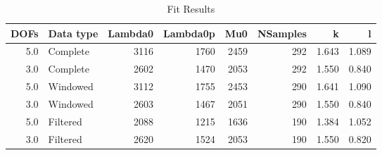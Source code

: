 \begin{table}
\centering
\caption{Fit Results}
\begin{tabular}{rlrrrrrr}
\toprule
 DOFs & Data type &  Lambda0 &  Lambda0p &   Mu0 &  NSamples &      k &      l \\
\midrule
  5.0 &  Complete &     3116 &      1760 &  2459 &       292 &  1.643 &  1.089 \\
  3.0 &  Complete &     2602 &      1470 &  2053 &       292 &  1.550 &  0.840 \\
  5.0 &  Windowed &     3112 &      1755 &  2453 &       290 &  1.641 &  1.090 \\
  3.0 &  Windowed &     2603 &      1467 &  2051 &       290 &  1.550 &  0.840 \\
  5.0 &  Filtered &     2088 &      1215 &  1636 &       190 &  1.384 &  1.052 \\
  3.0 &  Filtered &     2620 &      1524 &  2053 &       190 &  1.550 &  0.820 \\
\bottomrule
\end{tabular}
\end{table}
